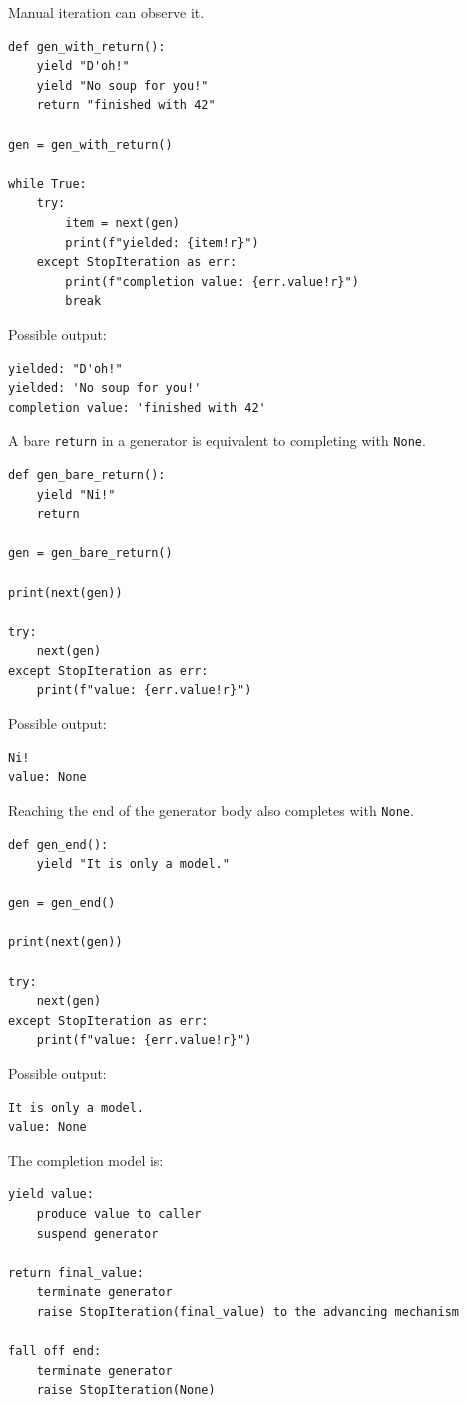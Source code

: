 Manual iteration can observe it.

\begin{verbatim}
def gen_with_return():
    yield "D'oh!"
    yield "No soup for you!"
    return "finished with 42"

gen = gen_with_return()

while True:
    try:
        item = next(gen)
        print(f"yielded: {item!r}")
    except StopIteration as err:
        print(f"completion value: {err.value!r}")
        break
\end{verbatim}

Possible output:

\begin{verbatim}
yielded: "D'oh!"
yielded: 'No soup for you!'
completion value: 'finished with 42'
\end{verbatim}

A bare \texttt{return} in a generator is equivalent to completing with \texttt{None}.

\begin{verbatim}
def gen_bare_return():
    yield "Ni!"
    return

gen = gen_bare_return()

print(next(gen))

try:
    next(gen)
except StopIteration as err:
    print(f"value: {err.value!r}")
\end{verbatim}

Possible output:

\begin{verbatim}
Ni!
value: None
\end{verbatim}

Reaching the end of the generator body also completes with \texttt{None}.

\begin{verbatim}
def gen_end():
    yield "It is only a model."

gen = gen_end()

print(next(gen))

try:
    next(gen)
except StopIteration as err:
    print(f"value: {err.value!r}")
\end{verbatim}

Possible output:

\begin{verbatim}
It is only a model.
value: None
\end{verbatim}

The completion model is:

\begin{verbatim}
yield value:
    produce value to caller
    suspend generator

return final_value:
    terminate generator
    raise StopIteration(final_value) to the advancing mechanism

fall off end:
    terminate generator
    raise StopIteration(None)
\end{verbatim}

